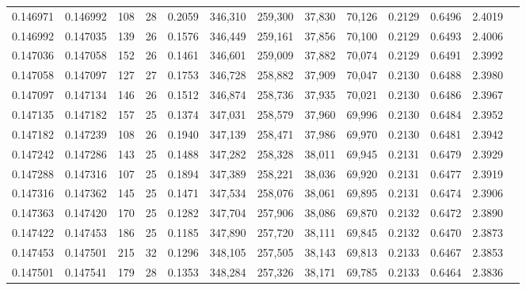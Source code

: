 \begin{tabular}{rrrrrrrrrrrrr}
0.146971 & 0.146992 & 108 &  28 &                                     0.2059 & 346,310 & 259,300 &  37,830 &  70,126 & 0.2129 & 0.6496 & 2.4019 \\
0.146992 & 0.147035 & 139 &  26 &                                     0.1576 & 346,449 & 259,161 &  37,856 &  70,100 & 0.2129 & 0.6493 & 2.4006 \\
0.147036 & 0.147058 & 152 &  26 &                                     0.1461 & 346,601 & 259,009 &  37,882 &  70,074 & 0.2129 & 0.6491 & 2.3992 \\
0.147058 & 0.147097 & 127 &  27 &                                     0.1753 & 346,728 & 258,882 &  37,909 &  70,047 & 0.2130 & 0.6488 & 2.3980 \\
0.147097 & 0.147134 & 146 &  26 &                                     0.1512 & 346,874 & 258,736 &  37,935 &  70,021 & 0.2130 & 0.6486 & 2.3967 \\
0.147135 & 0.147182 & 157 &  25 &                                     0.1374 & 347,031 & 258,579 &  37,960 &  69,996 & 0.2130 & 0.6484 & 2.3952 \\
0.147182 & 0.147239 & 108 &  26 &                                     0.1940 & 347,139 & 258,471 &  37,986 &  69,970 & 0.2130 & 0.6481 & 2.3942 \\
0.147242 & 0.147286 & 143 &  25 &                                     0.1488 & 347,282 & 258,328 &  38,011 &  69,945 & 0.2131 & 0.6479 & 2.3929 \\
0.147288 & 0.147316 & 107 &  25 &                                     0.1894 & 347,389 & 258,221 &  38,036 &  69,920 & 0.2131 & 0.6477 & 2.3919 \\
0.147316 & 0.147362 & 145 &  25 &                                     0.1471 & 347,534 & 258,076 &  38,061 &  69,895 & 0.2131 & 0.6474 & 2.3906 \\
0.147363 & 0.147420 & 170 &  25 &                                     0.1282 & 347,704 & 257,906 &  38,086 &  69,870 & 0.2132 & 0.6472 & 2.3890 \\
0.147422 & 0.147453 & 186 &  25 &                                     0.1185 & 347,890 & 257,720 &  38,111 &  69,845 & 0.2132 & 0.6470 & 2.3873 \\
0.147453 & 0.147501 & 215 &  32 &                                     0.1296 & 348,105 & 257,505 &  38,143 &  69,813 & 0.2133 & 0.6467 & 2.3853 \\
0.147501 & 0.147541 & 179 &  28 &                                     0.1353 & 348,284 & 257,326 &  38,171 &  69,785 & 0.2133 & 0.6464 & 2.3836 \\

\end{tabular}

